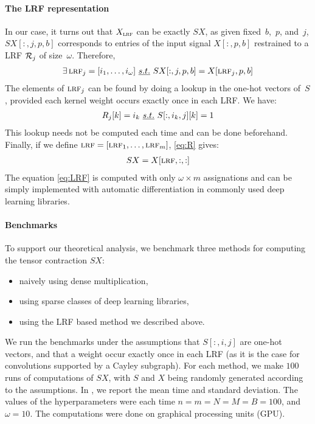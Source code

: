 \paragraph{The LRF representation}
In our case, it turns out that $X_{\operatorname{\textsc{lrf}}}$ can be exactly $SX$, as given fixed~$b$,~$p$, and~$j$, $SX[:,j,p,b]$ corresponds to entries of the input signal $X[:,p,b]$ restrained to a LRF $\mathcal{R}_j$ of size~$\omega$. Therefore,
\begin{gather}
\exists \operatorname{\textsc{lrf}}_j = [i_1, \ldots, i_\omega]~\emph{s.t.}~ SX[:,j,p,b] = X[\operatorname{\textsc{lrf}}_j, p, b]
\label{eq:R}
\end{gather}
The elements of $\operatorname{\textsc{lrf}}_j$ can be found by doing a lookup in the one-hot vectors of~$S$, provided each kernel weight occurs exactly once in each LRF. We have:
\begin{gather}
R_j[k] = i_k~\emph{s.t.}~ S[:,i_k,j][k] = 1
\end{gather}
This lookup needs not be computed each time and can be done beforehand. Finally, if we define $\operatorname{\textsc{lrf}} = [\operatorname{\textsc{lrf}}_1, \ldots, \operatorname{\textsc{lrf}}_m]$, \eqref{eq:R} gives:
\begin{gather}
SX = X[\operatorname{\textsc{lrf}}, :, :]
\label{eq:LRF}
\end{gather}
The equation \eqref{eq:LRF} is computed with only $\omega \times m$ assignations and can be simply implemented with automatic differentiation in commonly used deep learning libraries.

\paragraph{Benchmarks}
To support our theoretical analysis, we benchmark three methods for computing the tensor contraction $SX$:
\begin{itemize}
  \item naively using dense multiplication,
  \item using sparse classes of deep learning libraries,
  \item using the LRF based method we described above.
\end{itemize}

We run the benchmarks under the assumptions that $S[:,i,j]$ are one-hot vectors, and that a weight occur exactly once in each LRF (as it is the case for convolutions supported by a Cayley subgraph). For each method, we make $100$ runs of computations of $SX$, with $S$ and $X$ being randomly generated according to the assumptions. In , we report the mean time and standard deviation. The values of the hyperparameters were each time $n = m = N = M = B = 100$, and $\omega = 10$. The computations were done on graphical processing units (GPU).

